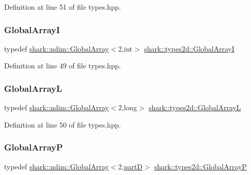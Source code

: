 Definition at line 51 of file types.\+hpp.

\hypertarget{namespaceshark_1_1types2d_a39a9fe43083ea314e6888261999a5150}{}\label{namespaceshark_1_1types2d_a39a9fe43083ea314e6888261999a5150} 
\subsubsection{\texorpdfstring{Global\+ArrayI}{GlobalArrayI}}
{\footnotesize\ttfamily typedef \hyperlink{classshark_1_1ndim_1_1_global_array}{shark\+::ndim\+::\+Global\+Array}$<$2,int$>$ \hyperlink{namespaceshark_1_1types2d_a39a9fe43083ea314e6888261999a5150}{shark\+::types2d\+::\+Global\+ArrayI}}



Definition at line 49 of file types.\+hpp.

\hypertarget{namespaceshark_1_1types2d_ab6446fd191a5f7a1c40c0ef58211aee9}{}\label{namespaceshark_1_1types2d_ab6446fd191a5f7a1c40c0ef58211aee9} 
\subsubsection{\texorpdfstring{Global\+ArrayL}{GlobalArrayL}}
{\footnotesize\ttfamily typedef \hyperlink{classshark_1_1ndim_1_1_global_array}{shark\+::ndim\+::\+Global\+Array}$<$2,long$>$ \hyperlink{namespaceshark_1_1types2d_ab6446fd191a5f7a1c40c0ef58211aee9}{shark\+::types2d\+::\+Global\+ArrayL}}



Definition at line 50 of file types.\+hpp.

\hypertarget{namespaceshark_1_1types2d_a513d51b67cefb022178c1c1fd9a018ad}{}\label{namespaceshark_1_1types2d_a513d51b67cefb022178c1c1fd9a018ad} 
\subsubsection{\texorpdfstring{Global\+ArrayP}{GlobalArrayP}}
{\footnotesize\ttfamily typedef \hyperlink{classshark_1_1ndim_1_1_global_array}{shark\+::ndim\+::\+Global\+Array}$<$2,\hyperlink{namespaceshark_1_1types2d_a87ef5d69759f5e1abf90fa90d89ff15c}{partD}$>$ \hyperlink{namespaceshark_1_1types2d_a513d51b67cefb022178c1c1fd9a018ad}{shark\+::types2d\+::\+Global\+ArrayP}}




